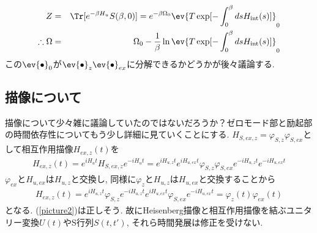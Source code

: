 \documentclass[10.5pt,a4paper]{jreport}
\begin{document}

\begin{eqnarray}
  Z &=& \Tr[e^{-\beta H_u}S(\beta, 0)] = e^{-\beta\Omega_0}\ev{T\exp[-\int_0^\beta ds H_{\rm int}(s)]}_0\\
  \therefore \Omega &=& \Omega_0 -\frac{1}{\beta}\ln\ev{T\exp[-\int_0^\beta ds H_{\rm int}(s)]}_0\label{Perturbed-thermo2}
\end{eqnarray}
この$\ev{\bullet}_0$が$\ev{\bullet}_{z}\ev{\bullet}_{ex}$に分解できるかどうかが後々議論する. 

\subsection{描像について}
描像について少々雑に議論していたのではないだろうか？ゼロモード部と励起部の時間依存性についてもう少し詳細に見ていくことにする. $H_{S, ex, z} = \varphi_{S, z}\varphi_{S, ex}$として相互作用描像$H_{ex, z}(t)$を
\begin{eqnarray}
  H_{ex, z}(t) = e^{iH_ut}H_{S, ex, z}e^{-iH_ut} = e^{iH_{u, z}t}e^{iH_{u, ex}t}\varphi_{S, z}\varphi_{S, ex}e^{-iH_{u, z}t}e^{-iH_{u, ex}t}
\end{eqnarray}
$\varphi_{ex}$と$H_{u, ex}$は$H_{u, z}$と交換し, 同様に$\varphi_{z}$と$H_{u, z}$は$H_{u, ex}$と交換することから
\begin{eqnarray}
  H_{ex, z}(t) = e^{iH_{u, z}t}\varphi_{S, z}e^{-iH_{u, z}t}e^{iH_{u, ex}t}\varphi_{S, ex}e^{-iH_{u, ex}t} = \varphi_{z}(t)\varphi_{ex}(t)
\end{eqnarray}
となる. (\ref{picture2})は正しそう. 故にHeisenberg描像と相互作用描像を結ぶユニタリー変換$U(t)$やS行列$S(t, t')$, それら時間発展は修正を受けない.
\end{document}
